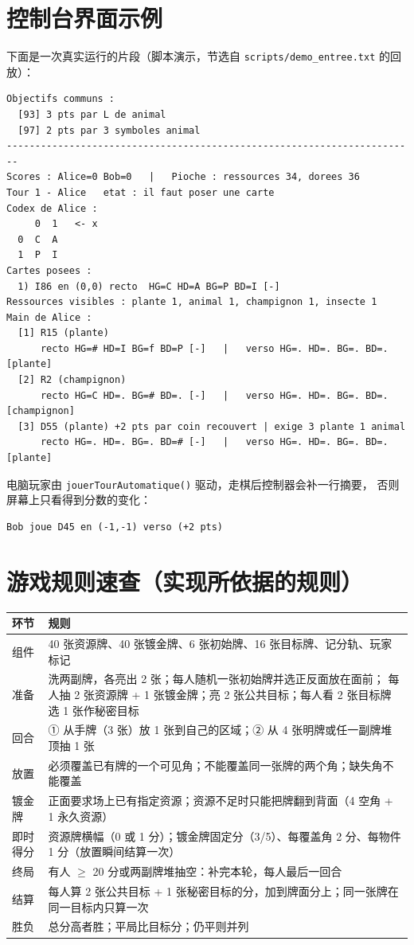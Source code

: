 \documentclass[11pt,a4paper]{ctexart}
\newcommand{\cl}[1]{\texttt{#1}}
\begin{document}
\section{控制台界面示例}
下面是一次真实运行的片段（脚本演示，节选自 \cl{scripts/demo\_entree.txt} 的回放）：
\begin{lstlisting}
Objectifs communs :
  [93] 3 pts par L de animal
  [97] 2 pts par 3 symboles animal
------------------------------------------------------------------------
Scores : Alice=0 Bob=0   |   Pioche : ressources 34, dorees 36
Tour 1 - Alice   etat : il faut poser une carte
Codex de Alice :
     0  1   <- x
  0  C  A
  1  P  I
Cartes posees :
  1) I86 en (0,0) recto  HG=C HD=A BG=P BD=I [-]
Ressources visibles : plante 1, animal 1, champignon 1, insecte 1
Main de Alice :
  [1] R15 (plante)
      recto HG=# HD=I BG=f BD=P [-]   |   verso HG=. HD=. BG=. BD=. [plante]
  [2] R2 (champignon)
      recto HG=C HD=. BG=# BD=. [-]   |   verso HG=. HD=. BG=. BD=. [champignon]
  [3] D55 (plante) +2 pts par coin recouvert | exige 3 plante 1 animal
      recto HG=. HD=. BG=. BD=# [-]   |   verso HG=. HD=. BG=. BD=. [plante]
\end{lstlisting}
电脑玩家由 \cl{jouerTourAutomatique()} 驱动，走棋后控制器会补一行摘要，
否则屏幕上只看得到分数的变化：
\begin{lstlisting}
Bob joue D45 en (-1,-1) verso (+2 pts)
\end{lstlisting}

\section{游戏规则速查（实现所依据的规则）}
\begin{longtable}{p{3.4cm}p{10.6cm}}
\toprule
环节 & 规则 \\
\midrule
组件 & 40 张资源牌、40 张镀金牌、6 张初始牌、16 张目标牌、记分轨、玩家标记 \\
准备 & 洗两副牌，各亮出 2 张；每人随机一张初始牌并选正反面放在面前；
每人抽 2 张资源牌 + 1 张镀金牌；亮 2 张公共目标；每人看 2 张目标牌选 1 张作秘密目标 \\
回合 & ① 从手牌（3 张）放 1 张到自己的区域；② 从 4 张明牌或任一副牌堆顶抽 1 张 \\
放置 & 必须覆盖已有牌的一个可见角；不能覆盖同一张牌的两个角；缺失角不能覆盖 \\
镀金牌 & 正面要求场上已有指定资源；资源不足时只能把牌翻到背面（4 空角 + 1 永久资源） \\
即时得分 & 资源牌横幅（0 或 1 分）；镀金牌固定分（3/5）、每覆盖角 2 分、每物件 1 分（放置瞬间结算一次） \\
终局 & 有人 $\ge$ 20 分或两副牌堆抽空：补完本轮，每人最后一回合 \\
结算 & 每人算 2 张公共目标 + 1 张秘密目标的分，加到牌面分上；同一张牌在同一目标内只算一次 \\
胜负 & 总分高者胜；平局比目标分；仍平则并列 \\
\bottomrule
\end{longtable}
\end{document}

